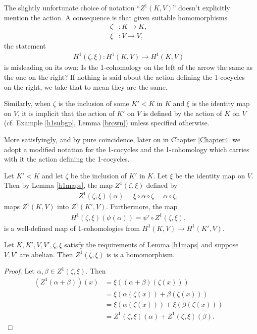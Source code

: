 \begin{remark}
	The slightly unfortunate choice of notation ``$Z^1(K, V)$'' doesn't explicitly mention the action. A consequence is that given suitable homomorphisms
	\begin{align*}
		\zeta&:K \rightarrow K, \\
		\xi&: V \rightarrow V,
	\end{align*}
	the statement
	\begin{align*}
		H^1(\zeta, \xi):H^1(K, V) \rightarrow H^1(K, V)
	\end{align*}
	is misleading on its own: Is the 1-cohomology on the left of the arrow the same as the one on the right? If nothing is said about the action defining the 1-cocycles on the right, we take that to mean they are the same.

	Similarly, when $\zeta$ is the inclusion of some $K' < K$ in $K$ and $\xi$ is the identity map on $V$, it is implicit that the action of $K'$ on $V$ is defined by the action of $K$ on $V$ (cf. Example \ref{h1subgp}, Lemma \ref{brown}) unless specified otherwise.

	More satisfyingly, and by pure coincidence, later on in Chapter \ref{Chapter4} we adopt a modified notation for the 1-cocycles and the 1-cohomology which carries with it the action defining the 1-cocycles.
\end{remark}

\begin{example} \label{h1subgp}
	Let $K' < K$ and let $\zeta$ be the inclusion of $K'$ in $K$. Let $\xi$ be the identity map on $V$. Then by Lemma \ref{h1maps}, the map $Z^1(\zeta, \xi)$ defined by
\begin{align*}
	Z^1(\zeta, \xi)(\alpha) = \xi \circ \alpha \circ \zeta = \alpha \circ \zeta,
\end{align*}
maps $Z^1(K, V)$ into $Z^1(K', V)$. Furthermore, the map
\begin{align*}
	H^1(\zeta, \xi)(\psi(\alpha)) = \psi' \circ Z^1(\zeta, \xi),
\end{align*}
is a well-defined map of 1-cohomologies from $H^1(K, V) \rightarrow H^1(K', V)$.
\end{example}

\begin{corollary} \label{zlinear} Let $K,K',V,V',\zeta,\xi$ satisfy the requirements of Lemma \ref{h1maps} and suppose $V,V'$ are abelian. Then $Z^1(\zeta, \xi)$ is is a homomorphism.
\end{corollary}
\begin{proof}
	Let $\alpha, \beta \in Z^1(\zeta, \xi)$. Then
\begin{align*}
	\left(Z^1(\alpha + \beta)\right)(x) &= \xi\left((\alpha + \beta)(\zeta(x))\right) \\
		&= \xi\left(\alpha(\zeta(x)) + \beta(\zeta(x))\right) \\
		&= \xi\left(\alpha(\zeta(x))\right) + \xi\left(\beta(\zeta(x))\right) \\
		&= Z^1(\zeta, \xi)(\alpha) + Z^1(\zeta, \xi)(\beta).
\end{align*}
\end{proof}

